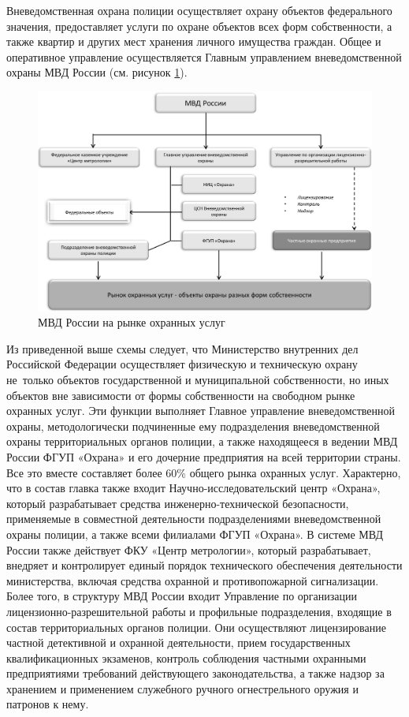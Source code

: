 \documentclass[a4paper,12pt,fleqn]{article} %
\begin{document}
Вневедомственная охрана полиции осуществляет охрану объектов федерального значения, предоставляет услуги по охране объектов всех форм собственности, а также квартир и других мест хранения личного имущества граждан. Общее и оперативное управление осуществляется Главным управлением вневедомственной охраны МВД России (см. рисунок \ref{image6}).

\begin{figure}[h]
	\centering
	\includegraphics[scale=0.7]{img6}
	\caption{МВД России на рынке охранных услуг}
	\label{image6}
\end{figure}

Из приведенной выше схемы следует, что Министерство внутренних дел Российской Федерации осуществляет физическую и техническую охрану не~только объектов государственной и муниципальной собственности, но иных объектов вне зависимости от формы собственности на свободном рынке охранных услуг. Эти функции выполняет Главное управление вневедомственной охраны, методологически подчиненные ему подразделения вневедомственной охраны территориальных органов полиции, а также находящееся в ведении МВД России ФГУП «Охрана» и его дочерние предприятия на всей территории страны. Все это вместе составляет более 60\% общего рынка охранных услуг. Характерно, что в состав главка также входит Научно-исследовательский центр «Охрана», который разрабатывает средства инженерно-технической безопасности, применяемые в совместной деятельности подразделениями вневедомственной охраны полиции, а также всеми филиалами ФГУП «Охрана». В системе МВД России также действует ФКУ «Центр метрологии», который разрабатывает, внедряет и контролирует единый порядок технического обеспечения деятельности министерства, включая средства охранной и противопожарной сигнализации. Более того, в структуру МВД России входит Управление по организации лицензионно-разрешительной работы и профильные подразделения, входящие в состав территориальных органов полиции. Они осуществляют лицензирование частной детективной и охранной деятельности, прием государственных квалификационных экзаменов, контроль соблюдения частными охранными предприятиями требований действующего законодательства, а также надзор за хранением и применением служебного ручного огнестрельного оружия и патронов к нему.
\end{document}
